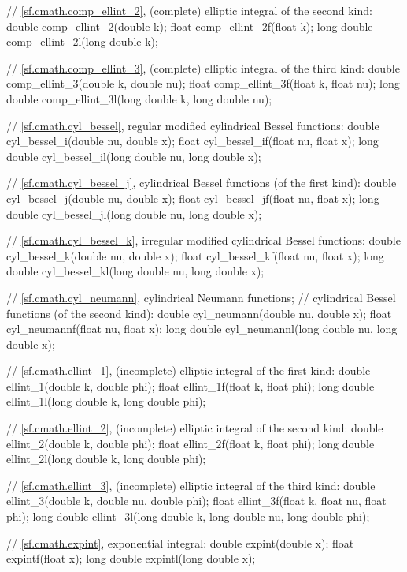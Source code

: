 \begin{codeblock}
{  // \ref{sf.cmath.comp_ellint_2}, (complete) elliptic integral of the second kind:
  double       comp_ellint_2(double k);
  float        comp_ellint_2f(float k);
  long double  comp_ellint_2l(long double k);

  // \ref{sf.cmath.comp_ellint_3}, (complete) elliptic integral of the third kind:
  double       comp_ellint_3(double k, double nu);
  float        comp_ellint_3f(float k, float nu);
  long double  comp_ellint_3l(long double k, long double nu);

  // \ref{sf.cmath.cyl_bessel}, regular modified cylindrical Bessel functions:
  double       cyl_bessel_i(double nu, double x);
  float        cyl_bessel_if(float nu, float x);
  long double  cyl_bessel_il(long double nu, long double x);

  // \ref{sf.cmath.cyl_bessel_j}, cylindrical Bessel functions (of the first kind):
  double       cyl_bessel_j(double nu, double x);
  float        cyl_bessel_jf(float nu, float x);
  long double  cyl_bessel_jl(long double nu, long double x);

  // \ref{sf.cmath.cyl_bessel_k}, irregular modified cylindrical Bessel functions:
  double       cyl_bessel_k(double nu, double x);
  float        cyl_bessel_kf(float nu, float x);
  long double  cyl_bessel_kl(long double nu, long double x);

  // \ref{sf.cmath.cyl_neumann}, cylindrical Neumann functions;
  // cylindrical Bessel functions (of the second kind):
  double       cyl_neumann(double nu, double x);
  float        cyl_neumannf(float nu, float x);
  long double  cyl_neumannl(long double nu, long double x);

  // \ref{sf.cmath.ellint_1}, (incomplete) elliptic integral of the first kind:
  double       ellint_1(double k, double phi);
  float        ellint_1f(float k, float phi);
  long double  ellint_1l(long double k, long double phi);

  // \ref{sf.cmath.ellint_2}, (incomplete) elliptic integral of the second kind:
  double       ellint_2(double k, double phi);
  float        ellint_2f(float k, float phi);
  long double  ellint_2l(long double k, long double phi);

  // \ref{sf.cmath.ellint_3}, (incomplete) elliptic integral of the third kind:
  double       ellint_3(double k, double nu, double phi);
  float        ellint_3f(float k, float nu, float phi);
  long double  ellint_3l(long double k, long double nu, long double phi);

  // \ref{sf.cmath.expint}, exponential integral:
  double       expint(double x);
  float        expintf(float x);
  long double  expintl(long double x);

}
\end{codeblock}
